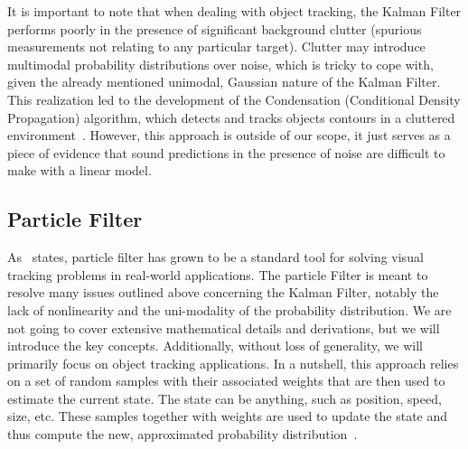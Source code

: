 It is important to note that when dealing with object tracking, the Kalman Filter performs poorly in the presence of significant background clutter (spurious measurements not relating to any particular target). Clutter may introduce multimodal probability distributions over noise, which is tricky to cope with, given the already mentioned unimodal, Gaussian nature of the Kalman Filter. This realization led to the development of the Condensation (Conditional Density Propagation) algorithm, which detects and tracks objects contours in a cluttered environment~\cite{isard1998condensation}. However, this approach is outside of our scope, it just serves as a piece of evidence that sound predictions in the presence of noise are difficult to make with a linear model.

\subsection{Particle Filter}
\label{ssec:ParticleFilter}

As~\cite{particle_filters_for_vot} states, particle filter has grown to be a standard tool for solving visual tracking problems in real-world applications. The particle Filter is meant to resolve many issues outlined above concerning the Kalman Filter, notably the lack of nonlinearity and the uni-modality of the probability distribution. We are not going to cover extensive mathematical details and derivations, but we will introduce the key concepts. Additionally, without loss of generality, we will primarily focus on object tracking applications. In a nutshell, this approach relies on a set of random samples with their associated weights that are then used to estimate the current state. The state can be anything, such as position, speed, size, etc. These samples together with weights are used to update the state and thus compute the new, approximated probability distribution~\cite{welch1995introduction}.

